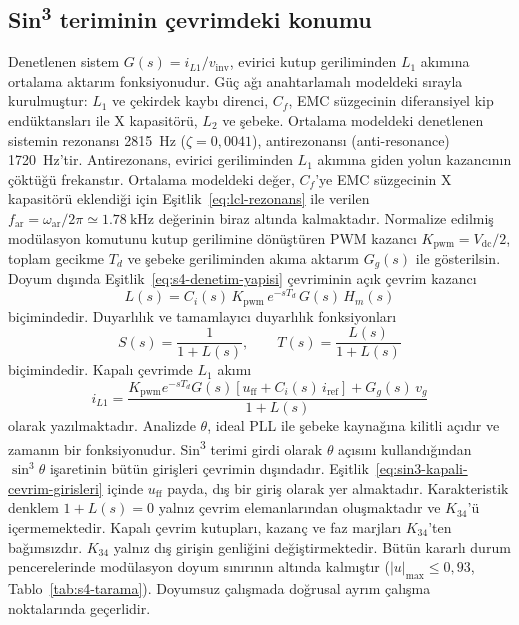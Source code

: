 \subsection{Sin\texorpdfstring{\textsuperscript{3}}{3} teriminin çevrimdeki konumu}

Denetlenen sistem $G(s)=i_{L1}/v_{\mathrm{inv}}$, evirici kutup geriliminden $L_1$ akımına ortalama aktarım fonksiyonudur. Güç ağı anahtarlamalı modeldeki sırayla kurulmuştur: $L_1$ ve çekirdek kaybı direnci, $C_f$, EMC süzgecinin diferansiyel kip endüktansları ile X kapasitörü, $L_2$ ve şebeke. Ortalama modeldeki denetlenen sistemin rezonansı \SI{2815}{\hertz} ($\zeta=0{,}0041$), antirezonansı (anti-resonance) \SI{1720}{\hertz}'tir. Antirezonans, evirici geriliminden $L_1$ akımına giden yolun kazancının çöktüğü frekanstır. Ortalama modeldeki değer, $C_f$'ye EMC süzgecinin X kapasitörü eklendiği için Eşitlik~\eqref{eq:lcl-rezonans} ile verilen $f_{\mathrm{ar}}=\omega_{\mathrm{ar}}/2\pi\simeq\SI{1.78}{\kilo\hertz}$ değerinin biraz altında kalmaktadır. Normalize edilmiş modülasyon komutunu kutup gerilimine dönüştüren PWM kazancı $K_{\mathrm{pwm}}=V_{\mathrm{dc}}/2$, toplam gecikme $T_d$ ve şebeke geriliminden akıma aktarım $G_g(s)$ ile gösterilsin. Doyum dışında Eşitlik~\eqref{eq:s4-denetim-yapisi} çevriminin açık çevrim kazancı
\begin{equation}
  L(s)=C_i(s)\,K_{\mathrm{pwm}}\,e^{-sT_d}\,G(s)\,H_m(s)
  \label{eq:sin3-acik-cevrim}
\end{equation}
biçimindedir. Duyarlılık ve tamamlayıcı duyarlılık fonksiyonları
\begin{equation}
  S(s)=\frac{1}{1+L(s)},
  \qquad
  T(s)=\frac{L(s)}{1+L(s)}
  \label{eq:sin3-duyarlilik}
\end{equation}
biçimindedir. Kapalı çevrimde $L_1$ akımı
\begin{equation}
  i_{L1}=\frac{K_{\mathrm{pwm}}e^{-sT_d}G(s)\left[u_{\mathrm{ff}}+C_i(s)\,i_{\mathrm{ref}}\right]+G_g(s)\,v_g}{1+L(s)}
  \label{eq:sin3-kapali-cevrim-girisleri}
\end{equation}
olarak yazılmaktadır. Analizde $\theta$, ideal PLL ile şebeke kaynağına kilitli açıdır ve zamanın bir fonksiyonudur. Sin\textsuperscript{3} terimi girdi olarak $\theta$ açısını kullandığından $\sin^3\theta$ işaretinin bütün girişleri çevrimin dışındadır. Eşitlik~\eqref{eq:sin3-kapali-cevrim-girisleri} içinde $u_{\mathrm{ff}}$ payda, dış bir giriş olarak yer almaktadır. Karakteristik denklem $1+L(s)=0$ yalnız çevrim elemanlarından oluşmaktadır ve $K_{34}$'ü içermemektedir. Kapalı çevrim kutupları, kazanç ve faz marjları $K_{34}$'ten bağımsızdır. $K_{34}$ yalnız dış girişin genliğini değiştirmektedir. Bütün kararlı durum pencerelerinde modülasyon doyum sınırının altında kalmıştır ($|u|_{\max}\leq0{,}93$, Tablo~\ref{tab:s4-tarama}). Doyumsuz çalışmada doğrusal ayrım çalışma noktalarında geçerlidir.

